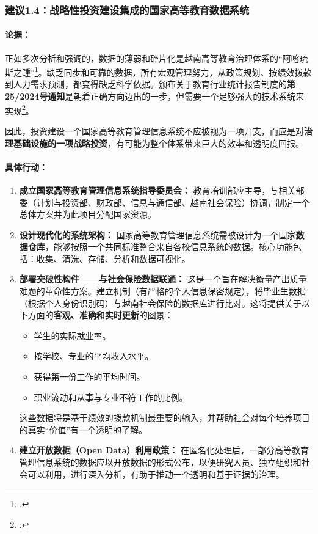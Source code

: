 \subsubsection{建议1.4：战略性投资建设集成的国家高等教育数据系统}

\paragraph{论据：}
正如多次分析和强调的，数据的薄弱和碎片化是越南高等教育治理体系的“阿喀琉斯之踵”\footcite{aunsec_redesigningIQA}。缺乏同步和可靠的数据，所有宏观管理努力，从政策规划、按绩效拨款到人力需求预测，都变得缺乏科学依据。颁布关于教育行业统计报告制度的\textbf{第25/2024号通知}是朝着正确方向迈出的一步，但需要一个足够强大的技术系统来实现\footcite{luatvietnam_tt25_2024}。

因此，投资建设一个国家高等教育管理信息系统不应被视为一项开支，而应是对\textbf{治理基础设施的一项战略投资}，有可能为整个体系带来巨大的效率和透明度回报。

\paragraph{具体行动：}
\begin{enumerate}
    \item \textbf{成立国家高等教育管理信息系统指导委员会：} 教育培训部应主导，与相关部委（计划与投资部、财政部、信息与通信部、越南社会保险）协调，制定一个总体方案并为此项目分配国家资源。
    
    \item \textbf{设计现代化的系统架构：} 国家高等教育管理信息系统需被设计为一个国家\textbf{数据仓库}，能够按照一个共同标准整合来自各校信息系统的数据。核心功能包括：收集、清洗、存储、分析和数据可视化。
    
    \item \textbf{部署突破性构件——与社会保险数据联通：} 这是一个旨在解决衡量产出质量难题的革命性方案。建立机制（有严格的个人信息保密规定），将毕业生数据（根据个人身份识别码）与越南社会保险的数据库进行比对。这将提供关于以下方面的\textbf{客观、准确和实时更新}的图景：
        \begin{itemize}
            \item 学生的实际就业率。
            \item 按学校、专业的平均收入水平。
            \item 获得第一份工作的平均时间。
            \item 职业流动和从事与专业不符工作的比例。
        \end{itemize}
    这些数据将是基于绩效的拨款机制最重要的输入，并帮助社会对每个培养项目的真实“价值”有一个透明的了解。
    
    \item \textbf{建立开放数据（Open Data）利用政策：} 在匿名化处理后，一部分高等教育管理信息系统的数据应以开放数据的形式公布，以便研究人员、独立组织和社会可以利用，进行深入分析，有助于推动一个透明和基于证据的治理。
\end{enumerate}

